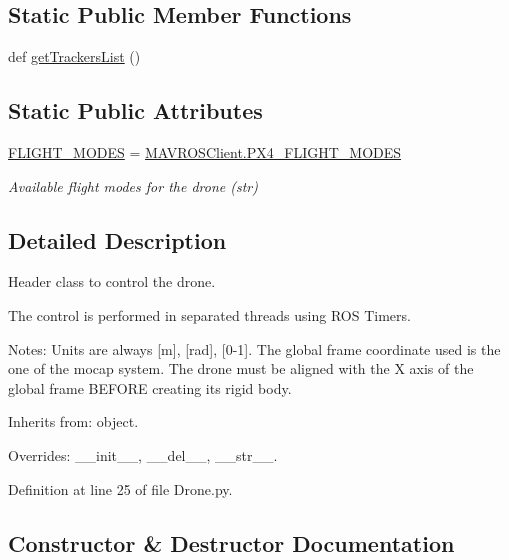 \subsection*{Static Public Member Functions}
\begin{DoxyCompactItemize}
\item 
def \mbox{\hyperlink{classwindshape_1_1drone_1_1_drone_1_1_drone_a7e7eced60d10a8b1eb38b7ebf6a02f0f}{get\+Trackers\+List}} ()
\end{DoxyCompactItemize}
\subsection*{Static Public Attributes}
\begin{DoxyCompactItemize}
\item 
\mbox{\hyperlink{classwindshape_1_1drone_1_1_drone_1_1_drone_a4c87638c6657286a90b0141e456e90bb}{F\+L\+I\+G\+H\+T\+\_\+\+M\+O\+D\+ES}} = \mbox{\hyperlink{classwindshape_1_1drone_1_1fcu_1_1_m_a_v_r_o_s_client_1_1_m_a_v_r_o_s_client_abe3ff6179ff5fb0a038f5f8c2b7728cb}{M\+A\+V\+R\+O\+S\+Client.\+P\+X4\+\_\+\+F\+L\+I\+G\+H\+T\+\_\+\+M\+O\+D\+ES}}
\begin{DoxyCompactList}\small\item\em Available flight modes for the drone (str) \end{DoxyCompactList}\end{DoxyCompactItemize}


\subsection{Detailed Description}
\begin{DoxyVerb}Header class to control the drone.

The control is performed in separated threads using ROS Timers.

Notes:
    Units are always [m], [rad], [0-1].
    The global frame coordinate used is the one of the mocap system.
    The drone must be aligned with the X axis of the global frame
    BEFORE creating its rigid body.

Inherits from: object.

Overrides: __init__, __del__, __str__.
\end{DoxyVerb}
 

Definition at line 25 of file Drone.\+py.



\subsection{Constructor \& Destructor Documentation}
\mbox{\label{classwindshape_1_1drone_1_1_drone_1_1_drone_ae2c508fe84e2be14bbf31812711cdfd6}} 

